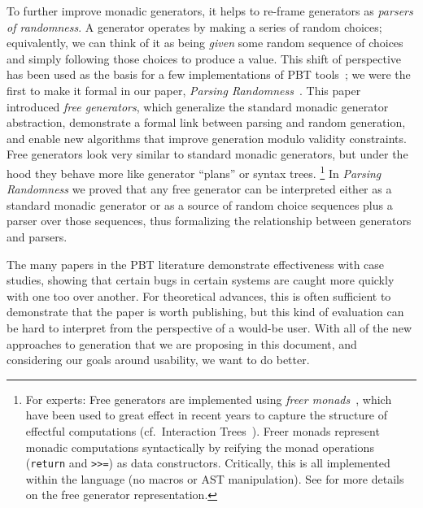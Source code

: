 To further improve monadic generators, it helps to re-frame generators as {\em
  parsers of randomness}. A generator
operates by making a series of random choices; equivalently, we can think of
it as being {\em given} some random sequence of choices and simply following
those choices to produce a value. This shift of perspective has been
used as the basis for a few implementations of PBT
tools~\cite{maciver2019hypothesis, dolan2017testing}; we were the
first to make it
formal in our paper, {\em Parsing Randomness}~\cite{goldstein2022parsing}.
%
This paper introduced {\em free generators}, which generalize the standard
monadic generator abstraction, demonstrate a formal link between parsing and
random generation, and enable new algorithms that improve
generation modulo validity constraints. Free generators look very
similar to standard monadic generators, but under the hood they behave more like
generator ``plans'' or syntax trees.%
\footnote{\normalsize For experts: Free generators are implemented using {\em freer
monads}~\cite{kiselyov2015freer}, which have been used to great effect in recent
years to capture the structure of effectful computations
(cf.~Interaction Trees~\cite{old:xia2019interaction}). Freer monads represent
monadic computations syntactically by reifying the monad operations
(\lstinline{return} and \lstinline{>>=}) as data constructors. Critically, this
is all implemented within the language (no macros or AST
manipulation). See \cite{goldstein2022parsing} for more details on the
free generator representation.}
In {\em Parsing Randomness} we proved that any free
generator can be interpreted
either as a standard monadic generator or as a source of
random choice sequences plus a parser over those sequences, thus formalizing the
relationship between generators and parsers.



\iflater{}\fi
%
The many papers in the PBT literature demonstrate effectiveness with case
studies, showing that certain bugs in certain systems are caught more quickly
with one too over another. For theoretical advances, this is often sufficient
to demonstrate that the paper is worth publishing, but this kind of evaluation
can be hard to interpret from the perspective of a would-be user. With all of
the new approaches to generation that we are proposing in this document, and
considering our goals around usability, we want to do better.

